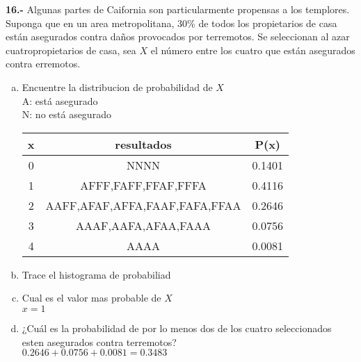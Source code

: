 \documentclass[12pt, letterpaper, spanish]{article}
\begin{document}
\textbf{16.-} Algunas partes de Caifornia son particularmente propensas a los templores. Suponga que en un area metropolitana, 30\% de todos los propietarios de casa están asegurados contra daños provocados por terremotos. Se seleccionan al azar cuatropropietarios de casa, sea $X$ el número entre los cuatro que están asegurados contra erremotos.\\
\begin{enumerate}[a)]
	\item Encuentre la distribucion  de probabilidad de $X$\\
	A: está asegurado\\
	N: no está asegurado\\
	\begin{tabular}{|c|c|c|}
		\hline
		x & resultados & P(x)\\ \hline
		0 & NNNN & 0.1401 \\ \hline
		1 & AFFF,FAFF,FFAF,FFFA & 0.4116 \\ \hline
		2 & AAFF,AFAF,AFFA,FAAF,FAFA,FFAA & 0.2646 \\ \hline
		3 & AAAF,AAFA,AFAA,FAAA & 0.0756 \\ \hline
		4 & AAAA & 0.0081 \\ \hline
	\end{tabular}
	\item Trace el histograma de probabiliad
	\item Cual es el valor mas probable de $X$\\
	$x=1$
	\item ¿Cuál es la probabilidad de por lo menos dos de los cuatro seleccionados esten asegurados contra terremotos? \\
	$0.2646+0.0756+0.0081=0.3483$
\end{enumerate}
\end{document}
